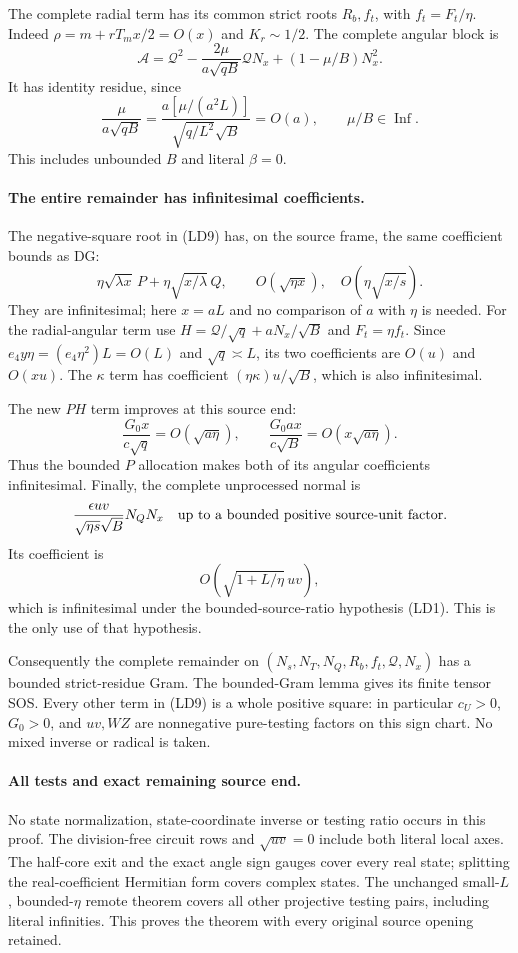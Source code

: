 The complete radial term has its common strict roots $R_b,f_t$,
with $f_t=F_t/\eta$. Indeed $\rho=m+rT_mx/2=O(x)$ and
$K_r\sim1/2$. The complete angular block is
\[
 \mathscr A=\mathcal Q^2-
       \frac{2\mu}{a\sqrt{qB}}\mathcal QN_x
                  +(1-\mu/B)N_x^2.
\]
It has identity residue, since
\[
 \frac{\mu}{a\sqrt{qB}}
       =\frac{a[\mu/(a^2L)]}{\sqrt{q/L^2}\sqrt B}=O(a),
 \qquad\mu/B\in\operatorname{Inf}.                 \tag{LD11}
\]
This includes unbounded $B$ and literal $\beta=0$.

\paragraph{The entire remainder has infinitesimal coefficients.}
The negative-square root in (LD9) has, on the source frame,
the same coefficient bounds as DG:
\[
 \eta\sqrt{\lambda x}\,P+
           \eta\sqrt{x/\lambda}\,Q,
 \qquad O(\sqrt{\eta x}),\quad
           O(\eta\sqrt{x/s}).                       \tag{LD12}
\]
They are infinitesimal; here $x=aL$ and no comparison of $a$ with
$\eta$ is needed. For the radial-angular term use
$H=\mathcal Q/\sqrt q+aN_x/\sqrt B$ and $F_t=\eta f_t$.
Since $e_4y\eta=(e_4\eta^2)L=O(L)$ and $\sqrt q\asymp L$,
its two coefficients are $O(u)$ and $O(xu)$.
The $\kappa$ term has coefficient
$(\eta\kappa)u/\sqrt B$, which is also infinitesimal.

The new $PH$ term improves at this source end:
\[
 \frac{G_0x}{c\sqrt q}=O(\sqrt{a\eta}),\qquad
 \frac{G_0ax}{c\sqrt B}=O(x\sqrt{a\eta}).            \tag{LD13}
\]
Thus the bounded $P$ allocation makes both of its angular coefficients
infinitesimal. Finally, the complete unprocessed normal is
\[
 \frac{\epsilon uv}{\sqrt{\eta s}\sqrt B}N_QN_x
   \quad\hbox{up to a bounded positive source-unit factor}.
\]
Its coefficient is
\[
                  O\!\left(\sqrt{1+L/\eta}\,uv\right),          \tag{LD14}
\]
which is infinitesimal under the bounded-source-ratio
hypothesis (LD1). This is the only use of that hypothesis.

Consequently the complete remainder on
$(N_s,N_T,N_Q,R_b,f_t,\mathcal Q,N_x)$ has a bounded strict-residue
Gram. The bounded-Gram lemma gives its finite tensor SOS. Every other
term in (LD9) is a whole positive square: in particular $c_U>0$,
$G_0>0$, and $uv,WZ$ are nonnegative pure-testing factors on this
sign chart. No mixed inverse or radical is taken.

\paragraph{All tests and exact remaining source end.}
No state normalization, state-coordinate inverse or testing ratio
occurs in this proof. The division-free circuit rows and
$\sqrt{uv}=0$ include both literal local axes. The half-core exit
and the exact angle sign gauges cover every real state; splitting
the real-coefficient Hermitian form covers complex states. The
unchanged small-$L$, bounded-$\eta$ remote theorem covers all other
projective testing pairs, including literal infinities. This proves
the theorem with every original source opening retained.

